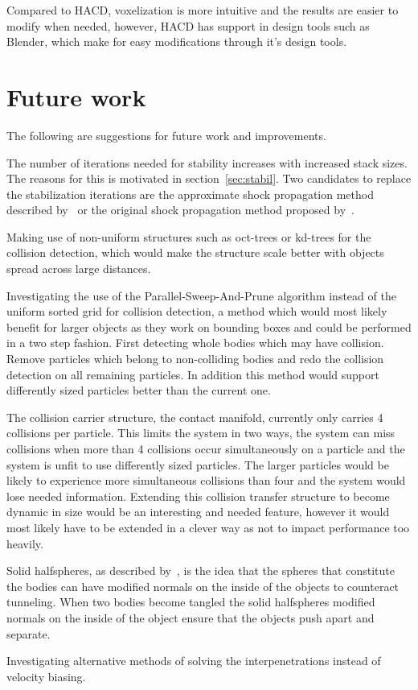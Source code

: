 Compared to HACD, voxelization is more intuitive and the results are easier to modify
when needed, however, HACD has support in design tools such as Blender, which make
for easy modifications through it's design tools.

\section{Future work}
The following are suggestions for future work and improvements.

The number of iterations needed for stability increases with increased stack sizes.
The reasons for this is motivated in section~\ref{sec:stabil}.
Two candidates to replace the stabilization iterations are
the approximate shock propagation method described by~\cite{flex} or the original
shock propagation method proposed by~\cite{guendelman}.

Making use of non-uniform structures such as oct-trees or kd-trees for the collision
detection, which would make the structure scale better with objects spread across
large distances.

Investigating the use of the Parallel-Sweep-And-Prune algorithm instead of the
uniform sorted grid for collision detection, a method which would most likely
benefit for larger objects as they work on bounding boxes and could be performed
in a two step fashion. First detecting whole bodies which may have collision.
Remove particles which belong to non-colliding bodies and redo the collision detection
on all remaining particles. In addition this method would support differently sized
particles better than the current one.

The collision carrier structure, the contact manifold, currently only carries
4 collisions per particle. This limits the system in two ways, the system can miss
collisions when more than 4 collisions occur simultaneously on a particle and the
system is unfit to use differently sized particles. The larger particles would
be likely to experience more simultaneous collisions than four and the system would
lose needed information. Extending this collision transfer structure to become dynamic
in size would be an interesting and needed feature, however it would most likely have
to be extended in a clever way as not to impact performance too heavily.

Solid halfspheres, as described by~\cite{flex}, is the idea that the spheres that
constitute the bodies can have modified normals on the inside of the objects to counteract
tunneling. When two bodies become tangled the solid halfspheres modified normals
on the inside of the object ensure that the objects push apart and separate.

Investigating alternative methods of solving the interpenetrations instead of velocity biasing.
